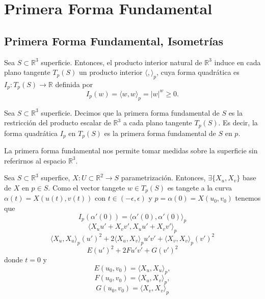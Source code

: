 \chapter{Primera Forma Fundamental}

\section{Primera Forma Fundamental, Isometrías}

\begin{prop}
  Sea $S \subset \mathbb{R}^{3}$ superficie. Entonces, el producto interior natural de $\mathbb{R}^{3}$ induce en cada plano tangente $T_{p}(S)$ un producto interior $\langle  { , } \rangle_{p}$, cuya forma quadrática es $I_{p} : T_{p}(S) \to \mathbb{R}$ definida por
  \[ 
    I_{p}(w) = \langle w{ , }w \rangle_{p} = | w |^{w} \geq 0.
  \] 
\end{prop}

\begin{defn}
  Sea $S \subset \mathbb{R}^{3}$ superficie. Decimos que la primera forma fundamental de $S$ es la restricción del producto escalar de $\mathbb{R}^{3}$ a cada plano tangente $T_{p}(S)$. Es decir, la forma quadrática $I_{p}$ en $T_{p}(S)$ es la primera forma fundamental de $S$ en $p$.
\end{defn}

\begin{obs}
  La primera forma fundamental nos permite tomar medidas sobre la superficie sin referirnos al espacio $\mathbb{R}^{3}$.
\end{obs}

\begin{note}
  Sea $S \subset \mathbb{R}^{3}$ superfice, $X : U \subset \mathbb{R}^{2} \to S$ parametrización. Entonces, $\exists \{ X_{u}, X_{v} \}$ base de $X$ en $p \in S$. Como el vector tangete $w \in T_{p}(S)$ es tangete a la curva $\alpha(t) = X(u(t), v(t))$ con $t \in (-\epsilon, \epsilon)$ y $p = \alpha(0) = X(u_{0}, v_{0})$ tenemos que
  \[ 
    I_{p}(\alpha'(0)) = \langle \alpha'(0){ , }\alpha'(0) \rangle_{p}
  \] 
  \[ 
    \langle X_{u}u' + X_{v}v'{ , } X_{u}u' + X_{v}v' \rangle_{p}
  \] 
  \[ 
    \langle X_{u}{ , }X_{u} \rangle_{p}(u')^{2} + 2 \langle X_{u}{ , }X_{v} \rangle_{p} u' v' + \langle X_{v}{ , }X_{v} \rangle_{p}(v')^{2} 
  \]
  \[ 
    E(u')^{2} + 2 F u' v' + G(v')^{2} 
  \] 
  donde $t = 0$ y 
  \[ 
    E(u_{0}, v_{0}) = \langle X_{u}{ , }X_{u} \rangle_{p},
  \] 
  \[ 
    F(u_{0}, v_{0}) = \langle X_{u}{ , }X_{v} \rangle_{p}, 
  \] 
  \[ 
    G(u_{0}, v_{0}) = \langle X_{v}{ , }X_{v} \rangle_{p} 
  \] 
\end{note}
